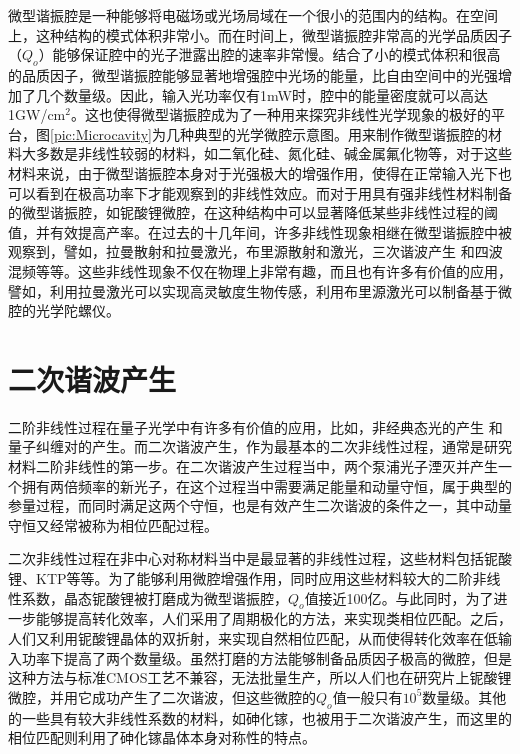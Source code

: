 微型谐振腔是一种能够将电磁场或光场局域在一个很小的范围内的结构。在空间上，这种结构的模式体积非常小。而在时间上，微型谐振腔非常高的光学品质因子（$Q_o$）能够保证腔中的光子泄露出腔的速率非常慢。结合了小的模式体积和很高的品质因子，微型谐振腔能够显著地增强腔中光场的能量，比自由空间中的光强增加了几个数量级。因此，输入光功率仅有1mW时，腔中的能量密度就可以高达1GW/cm$^2$\cite{vahala2003optical}。这也使得微型谐振腔成为了一种用来探究非线性光学现象的极好的平台，图\ref{pic:Microcavity}为几种典型的光学微腔示意图。用来制作微型谐振腔的材料大多数是非线性较弱的材料，如二氧化硅、氮化硅、碱金属氟化物等，对于这些材料来说，由于微型谐振腔本身对于光强极大的增强作用，使得在正常输入光下也可以看到在极高功率下才能观察到的非线性效应。而对于用具有强非线性材料制备的微型谐振腔，如铌酸锂微腔，在这种结构中可以显著降低某些非线性过程的阈值，并有效提高产率。在过去的十几年间，许多非线性现象相继在微型谐振腔中被观察到，譬如，拉曼散射和拉曼激光\cite{spillane2002ultralow, cai2000fiber, kippenberg2004ultralow}，布里源散射和激光\cite{li2012characterization, li2013microwave, li2014low, loh2015dual}，三次谐波产生\cite{carmon2007visible, farnesi2014optical}	和四波混频\cite{kippenberg2004kerr}等等。这些非线性现象不仅在物理上非常有趣，而且也有许多有价值的应用，譬如，利用拉曼激光可以实现高灵敏度生物传感\cite{ozdemir2014highly}，利用布里源激光可以制备基于微腔的光学陀螺仪\cite{li2015microresonator}。

\section{二次谐波产生}

二阶非线性过程在量子光学中有许多有价值的应用，比如，非经典态光的产生\cite{scully1999quantum}	和量子纠缠对的产生\cite{xu2008second}。而二次谐波产生，作为最基本的二次非线性过程，通常是研究材料二阶非线性的第一步。在二次谐波产生过程当中，两个泵浦光子湮灭并产生一个拥有两倍频率的新光子\cite{boyd2003nonlinear}，在这个过程当中需要满足能量和动量守恒，属于典型的参量过程，而同时满足这两个守恒，也是有效产生二次谐波的条件之一，其中动量守恒又经常被称为相位匹配过程。

	二次非线性过程在非中心对称材料当中是最显著的非线性过程，这些材料包括铌酸锂、KTP等等。为了能够利用微腔增强作用，同时应用这些材料较大的二阶非线性系数，晶态铌酸锂被打磨成为微型谐振腔，$Q_o$值接近100亿\cite{ilchenko2004nonlinear}。与此同时，为了进一步能够提高转化效率，人们采用了周期极化的方法，来实现类相位匹配。之后，人们又利用铌酸锂晶体的双折射，来实现自然相位匹配，从而使得转化效率在低输入功率下提高了两个数量级\cite{furst2010naturally}。虽然打磨的方法能够制备品质因子极高的微腔，但是这种方法与标准CMOS工艺不兼容，无法批量生产，所以人们也在研究片上铌酸锂微腔，并用它成功产生了二次谐波\cite{lin2015second}，但这些微腔的$Q_o$值一般只有$10^5$数量级。其他的一些具有较大非线性系数的材料，如砷化镓，也被用于二次谐波产生，而这里的相位匹配则利用了砷化镓晶体本身对称性的特点\cite{kuo2014second}。
	

